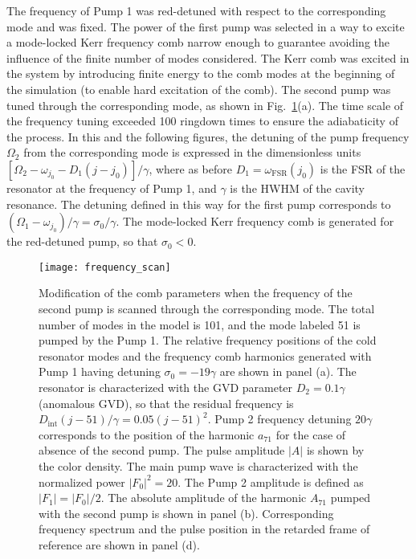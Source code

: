 The frequency of Pump 1 was red-detuned with respect to the corresponding mode and was fixed. The power of the first pump was selected in a way to excite a mode-locked Kerr frequency comb narrow enough to guarantee avoiding the influence of the finite number of modes considered. The Kerr comb was excited in the system by introducing finite energy to the comb modes at the beginning of the simulation (to enable hard excitation of the comb). The second pump was tuned through the corresponding mode, as shown in Fig.~\ref{fig:fscan}(a). The time scale of the frequency tuning exceeded 100 ringdown times to ensure the adiabaticity of the process. In this and the following figures, the detuning of the pump frequency $\Omega_2$ from the corresponding mode is expressed in the dimensionless units $[\Omega_2-\omega_{j_0}-D_1(j-j_0)]/\gamma$, where as before $D_1 = \omega_{\mathrm{FSR}}(j_0)$ is the FSR of the resonator at the frequency of Pump 1, and $\gamma$ is the HWHM of the cavity resonance. The detuning defined in this way for the first pump corresponds to $(\Omega_1-\omega_{j_0})/\gamma = \sigma_0/\gamma$. The mode-locked Kerr frequency comb is generated for the red-detuned pump, so that $\sigma_0 < 0$.
%
\begin{figure}[tbp]
  \centering
  \texttt{[image: frequency\_scan]}
\caption{ \small Modification of the comb parameters when the frequency of the second pump is scanned through the corresponding mode. The total number of modes in the model is 101, and the mode labeled 51 is pumped by the Pump 1. The relative frequency positions of the cold resonator modes and the frequency comb harmonics generated with Pump 1 having detuning $\sigma_0 = -19 \gamma$ are shown in panel (a). The resonator is characterized with the GVD parameter $D_2=0.1\gamma$ (anomalous GVD), so that the residual frequency is $D_\mathrm{int}(j - 51)/\gamma=0.05(j - 51)^2$. Pump 2 frequency detuning $20 \gamma$ corresponds to the position of the harmonic $a_{71}$ for the case of absence of the second pump.  The pulse amplitude $|A|$ is shown by the color density.   The main pump wave is characterized with the normalized power $|F_0|^2=20$. The Pump 2 amplitude is defined as $|F_1|=|F_0|/2$. The absolute amplitude of the harmonic $A_{71}$ pumped with the second pump is shown in panel (b). Corresponding frequency spectrum and the pulse position in the retarded frame of reference are shown in panel (d).
} \label{fig:fscan}
\end{figure}
%

